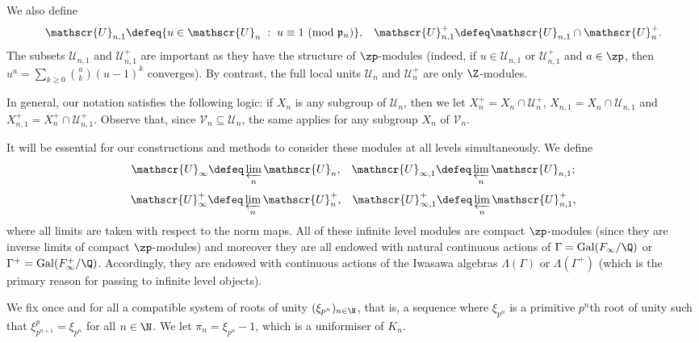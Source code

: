 \documentclass[a4paper,10pt, english, reqno]{smfart}
\newcommand{\GG}{\Gamma}
\numberwithin{equation}{section}
\begin{document}
We also define
\begin{equation}\label{eq:U1} \mathscr{U}_{n, 1} \defeq \{ u \in \mathscr{U}_n \; : \; u \equiv 1 \text { (mod } \mathfrak{p}_n) \}, \;\;\; \mathscr{U}_{n, 1}^+ \defeq \mathscr{U}_{n, 1} \cap \mathscr{U}_n^+. 
\end{equation}
The subsets $\mathscr{U}_{n,1}$ and $\mathscr{U}_{n,1}^+$ are important as they have the structure of $\zp$-modules (indeed, if $u \in \mathscr{U}_{n, 1}$ or $\mathscr{U}_{n, 1}^+$ and $a \in \zp$, then $u^a = \sum_{k \geq 0} {a \choose k} (u - 1)^k$ converges). By contrast, the full local units $\mathscr{U}_n$ and $\mathscr{U}_n^+$ are only $\Z$-modules. 

In general, our notation satisfies the following logic: if $X_n$ is any subgroup of $\mathscr{U}_n$, then we let $X_n^+ = X_n \cap \mathscr{U}_n^+$, $X_{n, 1} = X_n \cap \mathscr{U}_{n, 1}$ and $X_{n, 1}^+ = X_n^+ \cap \mathscr{U}_{n, 1}^+$. Observe that, since $\mathscr{V}_n \subseteq \mathscr{U}_n$, the same applies for any subgroup $X_n$ of $\mathscr{V}_n$.

It will be essential for our constructions and methods to consider these modules at all levels simultaneously. We define
\begin{equation}\label{eq:Uinfty 1} \mathscr{U}_{\infty} \defeq \varprojlim_n \mathscr{U}_n, \;\;\; \mathscr{U}_{\infty, 1} \defeq \varprojlim_n \mathscr{U}_{n, 1}; \end{equation}
\[ \mathscr{U}_{\infty}^+ \defeq \varprojlim_n \mathscr{U}_n^+, \;\;\; \mathscr{U}_{\infty, 1}^+ \defeq \varprojlim_n \mathscr{U}_{n, 1}^+, \]
where all limits are taken with respect to the norm maps. All of these infinite level modules are compact $\zp$-modules (since they are inverse limits of compact $\zp$-modules) and moreover they are all endowed with natural continuous actions of $\GG = \mathrm{Gal}(F_\infty / \Q)$ or $\GG^+ = \mathrm{Gal}(F_\infty^+ / \Q)$. Accordingly, they are endowed with continuous actions of the Iwasawa algebras $\Lambda(\GG)$ or $\Lambda(\GG^+)$ (which is the primary reason for passing to infinite level objects).

We fix once and for all a compatible system of roots of unity $(\xi_{p^n})_{n \in \N}$, that is, a sequence where $\xi_{p^n}$ is a primitive $p^n$th root of unity such that $\xi_{p^{n+1}}^p = \xi_{p^n}$ for all $n \in \N$. We let $\pi_n = \xi_{p^n} - 1$, which is a uniformiser of $K_n$. 
\end{document}
